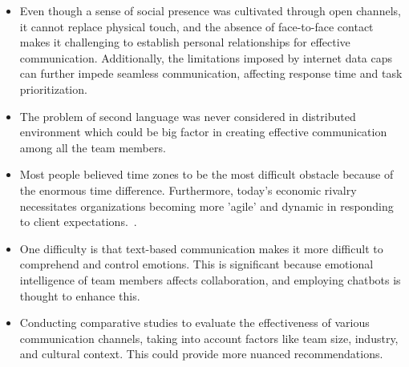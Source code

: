 \documentclass{llncs}
\begin{document}
\begin{itemize}

\item Even though a sense of social presence was cultivated through open channels, it cannot replace physical touch, and the absence of face-to-face contact makes it challenging to establish personal relationships for effective communication. Additionally, the limitations imposed by internet data caps can further impede seamless communication, affecting response time and task prioritization.~\cite{refpaper8} ~\cite{refpaper9}\\

\item The problem of second language was never considered in distributed environment which could be big factor in creating effective communication among all the team members. ~\cite{refpaper9}\\

\item Most people believed time zones to be the most difficult obstacle because of the enormous time difference. Furthermore, today's economic rivalry necessitates organizations becoming more 'agile' and dynamic in responding to client expectations.~\cite{refpaper10}. \\

\item One difficulty is that text-based communication makes it more difficult to comprehend and control emotions. This is significant because emotional intelligence of team members affects collaboration, and employing chatbots is thought to enhance this.~\cite{refpaper11} \\

\item Conducting comparative studies to evaluate the effectiveness of various communication channels, taking into account factors like team size, industry, and cultural context. This could provide more nuanced recommendations.

\end{itemize}
\end{document}
